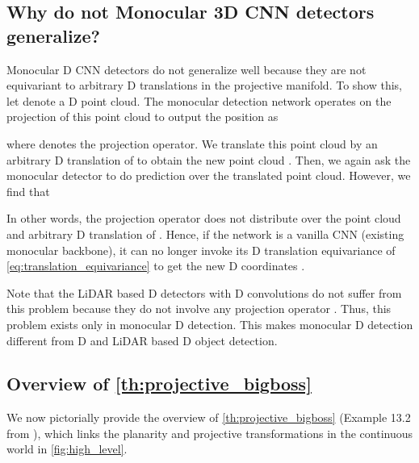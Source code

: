 \documentclass[runningheads]{llncs}
\newcommand{\twoD}{D}
\newcommand{\threeD}{D}
\newcommand{\lidar}{LiDAR}
\newcommand{\equivariant} {equivariant}
\newcommand{\equivariance}{equivariance}
\begin{document}
\subsection{Why do not Monocular 3D CNN detectors generalize?}
        Monocular \threeD{} CNN detectors do not generalize well because they are not \equivariant{} to arbitrary \threeD{} translations in the projective manifold.
        To show this, let  denote a \threeD{} point cloud.
        The monocular detection network  operates on the projection  of this point cloud  to output the position  as
        
        where  denotes the projection operator.
        We translate this point cloud by an arbitrary \threeD{} translation of  to obtain the new point cloud  . 
        Then, we again ask the monocular detector  to do prediction over the translated point cloud.
        However, we find that
        
        In other words, the projection operator  does not distribute over the point cloud  and arbitrary \threeD{} translation of .
        Hence, if the network  is a vanilla CNN (existing monocular backbone), it can no longer invoke its \twoD{} translation \equivariance{} of  \cref{eq:translation_equivariance} to get the new \threeD{} coordinates .
        
        Note that the \lidar{} based \threeD{} detectors with \threeD{} convolutions do not suffer from this problem because they do not involve any projection operator .
        Thus, this problem exists only in monocular \threeD{} detection. 
        This makes monocular \threeD{} detection different from \twoD{} and \lidar{} based \threeD{} object detection.


\subsection{Overview of \cref{th:projective_bigboss}}
    
        We now pictorially provide the overview of \cref{th:projective_bigboss} (Example 13.2 from \cite{hartley2003multiple}), which links the planarity and projective transformations in the continuous world in \cref{fig:high_level}.
    
\end{document}
